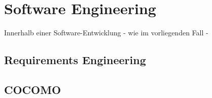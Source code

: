 \section{Software Engineering}{
Innerhalb einer Software-Entwicklung - wie im vorliegenden Fall - 

	\subsection{Requirements Engineering}

	
	\subsection{COCOMO}
	
}